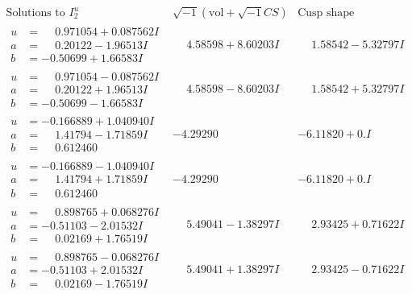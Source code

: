 \documentclass[1p]{elsarticle_modified}
\theoremstyle{definition}
\newcommand{\I}{\sqrt{-1}}
\begin{document}
$$\begin{array}{c|c|c}  
\text{Solutions to }I^u_{2}& \I (\text{vol} + \sqrt{-1}CS) & \text{Cusp shape}\\
 \hline 
\begin{aligned}
u &= \phantom{-}0.971054 + 0.087562 I \\
a &= \phantom{-}0.20122 - 1.96513 I \\
b &= -0.50699 + 1.66583 I\end{aligned}
 & \phantom{-}4.58598 + 8.60203 I & \phantom{-}1.58542 - 5.32797 I \\ \hline\begin{aligned}
u &= \phantom{-}0.971054 - 0.087562 I \\
a &= \phantom{-}0.20122 + 1.96513 I \\
b &= -0.50699 - 1.66583 I\end{aligned}
 & \phantom{-}4.58598 - 8.60203 I & \phantom{-}1.58542 + 5.32797 I \\ \hline\begin{aligned}
u &= -0.166889 + 1.040940 I \\
a &= \phantom{-}1.41794 - 1.71859 I \\
b &= \phantom{-}0.612460\phantom{ +0.000000I}\end{aligned}
 & -4.29290\phantom{ +0.000000I} & -6.11820 + 0. I\phantom{ +0.000000I} \\ \hline\begin{aligned}
u &= -0.166889 - 1.040940 I \\
a &= \phantom{-}1.41794 + 1.71859 I \\
b &= \phantom{-}0.612460\phantom{ +0.000000I}\end{aligned}
 & -4.29290\phantom{ +0.000000I} & -6.11820 + 0. I\phantom{ +0.000000I} \\ \hline\begin{aligned}
u &= \phantom{-}0.898765 + 0.068276 I \\
a &= -0.51103 - 2.01532 I \\
b &= \phantom{-}0.02169 + 1.76519 I\end{aligned}
 & \phantom{-}5.49041 - 1.38297 I & \phantom{-}2.93425 + 0.71622 I \\ \hline\begin{aligned}
u &= \phantom{-}0.898765 - 0.068276 I \\
a &= -0.51103 + 2.01532 I \\
b &= \phantom{-}0.02169 - 1.76519 I\end{aligned}
 & \phantom{-}5.49041 + 1.38297 I & \phantom{-}2.93425 - 0.71622 I \\ \hline\begin{aligned}

\end{aligned}
\end{array}$$
\end{document}
